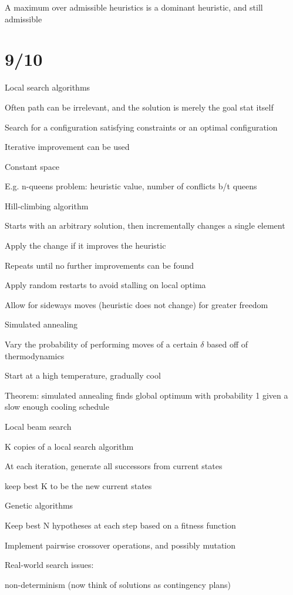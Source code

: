 \documentclass[12pt]{article}
\begin{document}
A maximum over admissible heuristics is a dominant heuristic, and still admissible

\section{9/10}

Local search algorithms

Often path can be irrelevant, and the solution is merely the goal stat itself

Search for a configuration satisfying constraints or an optimal configuration

Iterative improvement can be used

Constant space

E.g. n-queens problem: heuristic value, number of conflicts b/t queens

\noindent
Hill-climbing algorithm

Starts with an arbitrary solution, then incrementally changes a single element

Apply the change if it improves the heuristic

Repeats until no further improvements can be found

Apply random restarts to avoid stalling on local optima

Allow for sideways moves (heuristic does not change) for greater freedom

\noindent
Simulated annealing

Vary the probability of performing moves of a certain $\delta$ based off of thermodynamics

Start at a high temperature, gradually cool

Theorem: simulated annealing finds global optimum with probability 1 given a slow enough cooling schedule

\noindent
Local beam search

K copies of a local search algorithm

At each iteration, generate all successors from current states

keep best K to be the new current states

\noindent
Genetic algorithms

Keep best N hypotheses at each step based on a fitness function

Implement pairwise crossover operations, and possibly mutation

\noindent
Real-world search issues:

non-determinism (now think of solutions as contingency plans)
\end{document}

